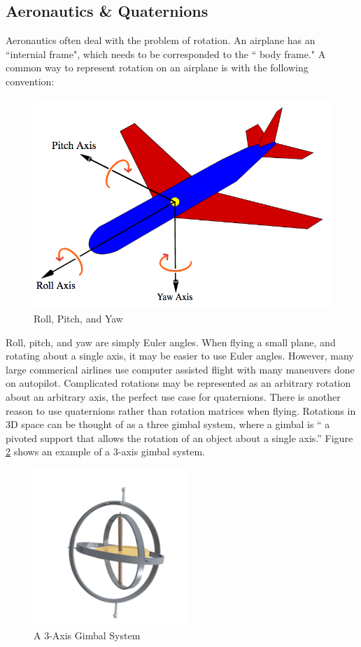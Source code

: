 \subsection{Aeronautics \& Quaternions}
Aeronautics often deal with the problem of rotation.
An airplane has an ``internial frame", which needs to be corresponded to the `` body frame."
A common way to represent rotation on an airplane is with the following convention:
\begin{figure}[H]
\centering
\includegraphics[width = .75\textwidth]{Figures/plane.png}
\caption{Roll, Pitch, and Yaw}
\label{fig:cycle}
\end{figure}
Roll, pitch, and yaw are simply Euler angles.
When flying a small plane, and rotating about a single axis, it may be easier to use Euler angles.
However, many large commerical airlines use computer assisted flight with many maneuvers done on autopilot.
Complicated rotations may be represented as an arbitrary rotation about an arbitrary axis, the perfect use case for quaternions.
There is another reason to use quaternions rather than rotation matrices when flying.
Rotations in 3D space can be thought of as a three gimbal system, where a gimbal is `` a pivoted support that allows the rotation of an object about a single axis.''
Figure \ref{fig:gimbal} shows an example of a 3-axis gimbal system.
\begin{figure}[H]
\centering
\includegraphics[width = .75\textwidth]{Figures/gimbal.png}
\caption{A 3-Axis Gimbal System}
\label{fig:gimbal}
\end{figure}
